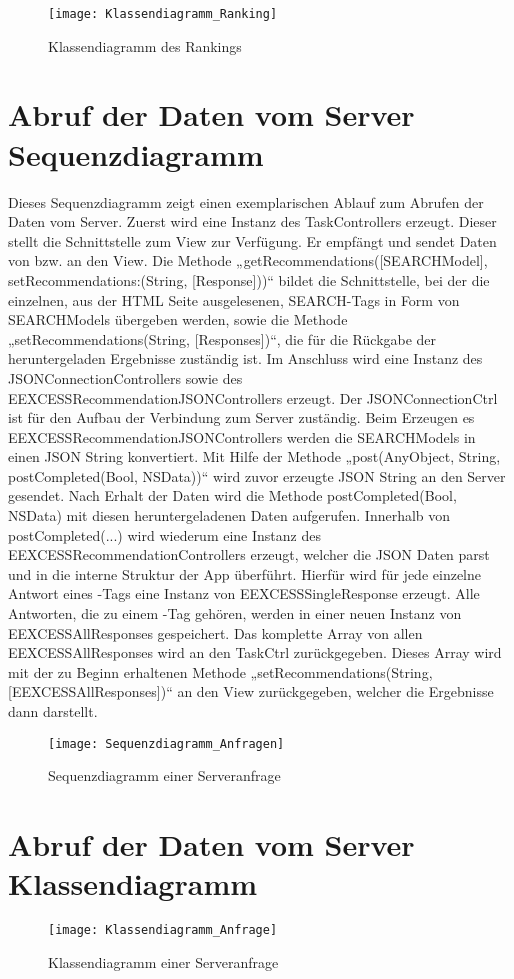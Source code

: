 \begin{figure}[h]
	\centering
	\texttt{[image: Klassendiagramm\_Ranking]}
	\caption{Klassendiagramm des Rankings}
	\label{fig:Ranking Klassendiagramm}
\end{figure}

\section{Abruf der Daten vom Server Sequenzdiagramm}

Dieses Sequenzdiagramm zeigt einen exemplarischen Ablauf zum Abrufen der Daten vom Server. Zuerst wird eine Instanz des TaskControllers erzeugt. Dieser stellt die Schnittstelle zum View zur Verfügung. Er empfängt und sendet Daten von bzw. an den View. Die Methode „getRecommendations([SEARCHModel], setRecommendations:(String, [Response]))“ bildet die Schnittstelle, bei der die einzelnen, aus der HTML Seite ausgelesenen, SEARCH-Tags in Form von SEARCHModels übergeben werden, sowie die Methode „setRecommendations(String, [Responses])“, die für die Rückgabe der heruntergeladen Ergebnisse zuständig ist. Im Anschluss wird eine Instanz des JSONConnectionControllers sowie des EEXCESSRecommendationJSONControllers erzeugt. Der JSONConnectionCtrl ist für den Aufbau der Verbindung zum Server zuständig. Beim Erzeugen es EEXCESSRecommendationJSONControllers werden die SEARCHModels in einen JSON String konvertiert. Mit Hilfe der Methode „post(AnyObject, String, postCompleted(Bool, NSData))“ wird zuvor erzeugte JSON String an den Server gesendet. Nach Erhalt der Daten wird die Methode postCompleted(Bool, NSData) mit diesen heruntergeladenen Daten aufgerufen. Innerhalb von 
postCompleted(...) wird wiederum eine Instanz des EEXCESSRecommendationControllers erzeugt, welcher die JSON Daten parst und in die interne Struktur der App überführt. Hierfür wird für jede einzelne Antwort eines \SEARCH-Tags eine Instanz von EEXCESSSingleResponse erzeugt. Alle Antworten, die zu einem \SEARCH-Tag gehören, werden in einer neuen Instanz von EEXCESSAllResponses gespeichert.  Das komplette Array von allen EEXCESSAllResponses wird an den TaskCtrl zurückgegeben. Dieses Array wird mit der zu Beginn erhaltenen Methode „setRecommendations(String, [EEXCESSAllResponses])“ an den View zurückgegeben, welcher die Ergebnisse dann darstellt. 

\begin{figure}[h]
	\centering
	\texttt{[image: Sequenzdiagramm\_Anfragen]}
	\caption{Sequenzdiagramm einer Serveranfrage}
	\label{fig:Anfrage Sequenzdiagramm}
\end{figure}

\section{Abruf der Daten vom Server Klassendiagramm}

\begin{figure}[h]
	\centering
	\texttt{[image: Klassendiagramm\_Anfrage]}
	\caption{Klassendiagramm einer Serveranfrage}
	\label{fig:Anfrage Klassendiagramm}
\end{figure}
